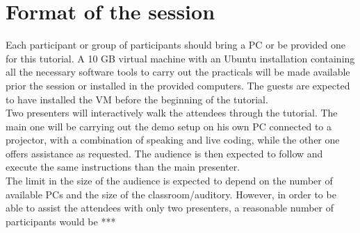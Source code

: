 \documentclass[
10pt, %
a4paper, %
oneside, %
BCOR5mm, %
]{scrartcl}
\begin{document}
\section{Format of the session}
\label{sec:format}
Each participant or group of participants should bring a PC or be provided one for this tutorial.
A 10 GB virtual machine with an Ubuntu installation containing all the necessary software tools to carry out the practicals will be made available prior the session or installed in the provided computers. 
The guests are expected to have installed the VM before the beginning of the tutorial.
\\
Two presenters will interactively walk the attendees through the tutorial. 
The main one will be carrying out the demo setup on his own PC connected to a projector, with a combination of speaking and live coding, while the other one offers assistance as requested. 
The audience is then expected to follow and execute the same instructions than the main presenter.
\\ 
The limit in the size of the audience is expected to depend on the number of available PCs and the size of the classroom/auditory.
However, in order to be able to assist the attendees with only two presenters, a reasonable number of participants would be ***


\renewcommand{\refname}{\spacedlowsmallcaps{References}} %

% 




\end{document}
